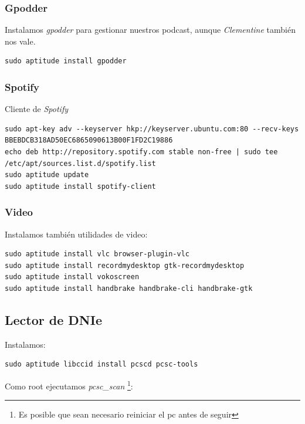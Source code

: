 \documentclass[12pt,spanish,]{scrartcl}
\begin{document}
\subsubsection{Gpodder}\label{gpodder}

Instalamos \emph{gpodder} para gestionar nuestros podcast, aunque
\emph{Clementine} también nos vale.

\begin{verbatim}
sudo aptitude install gpodder
\end{verbatim}

\subsubsection{Spotify}\label{spotify}

Cliente de \emph{Spotify}

\begin{verbatim}
sudo apt-key adv --keyserver hkp://keyserver.ubuntu.com:80 --recv-keys BBEBDCB318AD50EC6865090613B00F1FD2C19886
echo deb http://repository.spotify.com stable non-free | sudo tee /etc/apt/sources.list.d/spotify.list
sudo aptitude update
sudo aptitude install spotify-client
\end{verbatim}

\subsubsection{Video}\label{video}

Instalamos también utilidades de video:

\begin{verbatim}
sudo aptitude install vlc browser-plugin-vlc
sudo aptitude install recordmydesktop gtk-recordmydesktop
sudo aptitude install vokoscreen
sudo aptitude install handbrake handbrake-cli handbrake-gtk
\end{verbatim}

\subsection{Lector de DNIe}\label{lector-de-dnie}

Instalamos:

\begin{verbatim}
sudo aptitude libccid install pcscd pcsc-tools
\end{verbatim}

Como root ejecutamos \emph{pcsc\_scan} \footnote{Es posible que sean
  necesario reiniciar el pc antes de seguir}:
\end{document}

